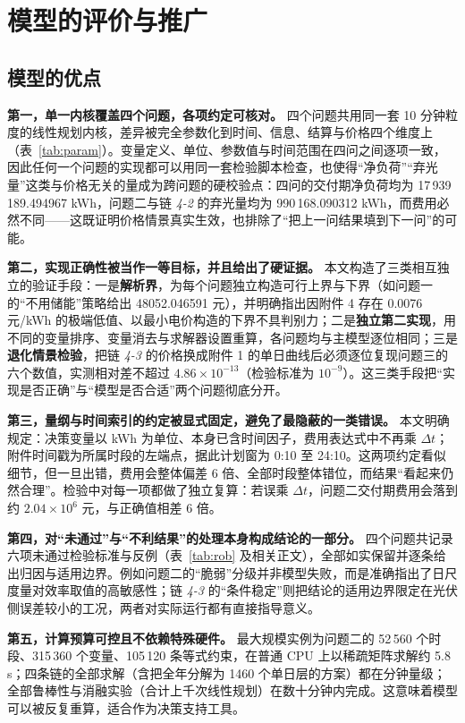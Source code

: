 \section{模型的评价与推广}

\subsection{模型的优点}

\textbf{第一，单一内核覆盖四个问题，各项约定可核对。} 四个问题共用同一套 10 分钟粒度的线性规划内核，差异被完全参数化到时间、信息、结算与价格四个维度上（表~\ref{tab:param}）。变量定义、单位、参数值与时间范围在四问之间逐项一致，因此任何一个问题的实现都可以用同一套检验脚本检查，也使得“净负荷”“弃光量”这类与价格无关的量成为跨问题的硬校验点：四问的交付期净负荷均为 17\,939\,189.494967 kWh，问题二与链 \emph{4-2} 的弃光量均为 990\,168.090312 kWh，而费用必然不同——这既证明价格情景真实生效，也排除了“把上一问结果填到下一问”的可能。

\textbf{第二，实现正确性被当作一等目标，并且给出了硬证据。} 本文构造了三类相互独立的验证手段：一是\textbf{解析界}，为每个问题独立构造可行上界与下界（如问题一的“不用储能”策略给出 48052.046591 元），并明确指出因附件 4 存在 0.0076 元/kWh 的极端低值、以最小电价构造的下界不具判别力；二是\textbf{独立第二实现}，用不同的变量排序、变量消去与求解器设置重算，各问题均与主模型逐位相同；三是\textbf{退化情景检验}，把链 \emph{4-3} 的价格换成附件 1 的单日曲线后必须逐位复现问题三的六个数值，实测相对差不超过 $4.86\times10^{-13}$（检验标准为 $10^{-9}$）。这三类手段把“实现是否正确”与“模型是否合适”两个问题彻底分开。

\textbf{第三，量纲与时间索引的约定被显式固定，避免了最隐蔽的一类错误。} 本文明确规定：决策变量以 kWh 为单位、本身已含时间因子，费用表达式中不再乘 $\Delta t$；附件时间戳为所属时段的左端点，据此计划窗为 0:10 至 24:10。这两项约定看似细节，但一旦出错，费用会整体偏差 6 倍、全部时段整体错位，而结果“看起来仍然合理”。检验中对每一项都做了独立复算：若误乘 $\Delta t$，问题二交付期费用会落到约 $2.04\times10^{6}$ 元，与正确值相差 6 倍。

\textbf{第四，对“未通过”与“不利结果”的处理本身构成结论的一部分。} 四个问题共记录六项未通过检验标准与反例（表~\ref{tab:rob} 及相关正文），全部如实保留并逐条给出归因与适用边界。例如问题二的“脆弱”分级并非模型失败，而是准确指出了日尺度量对效率取值的高敏感性；链 \emph{4-3} 的“条件稳定”则把结论的适用边界限定在光伏侧误差较小的工况，两者对实际运行都有直接指导意义。

\textbf{第五，计算预算可控且不依赖特殊硬件。} 最大规模实例为问题二的 52\,560 个时段、315\,360 个变量、105\,120 条等式约束，在普通 CPU 上以稀疏矩阵求解约 5.8 s；四条链的全部求解（含把全年分解为 1460 个单日层的方案）都在分钟量级；全部鲁棒性与消融实验（合计上千次线性规划）在数十分钟内完成。这意味着模型可以被反复重算，适合作为决策支持工具\cite{ref-hai-2025-microgrid-price-ems}。

